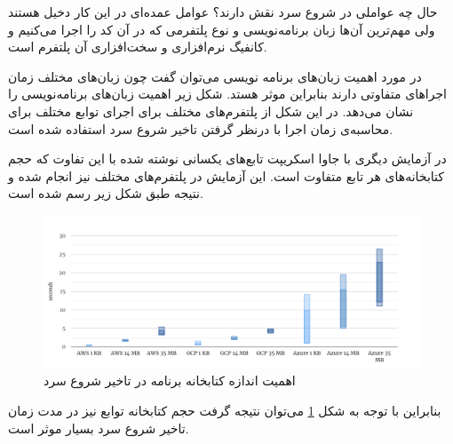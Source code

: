 حال چه عواملی در شروع سرد نقش دارند؟ عوامل عمده‌ای در این کار دخیل هستند ولی مهم‌ترین آن‌ها زبان برنامه‌نویسی و نوع پلتفرمی که در آن کد را اجرا می‌کنیم و کانفیگ نرم‌افزاری و سخت‌افزاری آن پلتفرم است. 

در مورد اهمیت زبان‌های برنامه نویسی می‌توان گفت چون زبان‌های مختلف زمان اجراهای متفاوتی دارند بنابراین موثر هستد. شکل زیر اهمیت زبان‌های برنامه‌نویسی را نشان می‌دهد. در این شکل از پلتفرم‌های مختلف برای اجرای توابع مختلف برای محاسبه‌ی زمان اجرا با درنظر گرفتن تاخیر شروع سرد استفاده شده است. 

در آزمایش دیگری با جاوا اسکریپت تابع‌های یکسانی نوشته شده با این تفاوت که حجم کتابخانه‌های هر تابع متفاوت است. این آزمایش در پلتفرم‌های مختلف نیز انجام شده و نتیجه طبق شکل زیر رسم شده است. 

\begin{figure}
	\centering
	\includegraphics[width=\linewidth]{figs/ColdStart-programming-language-libraries}
	\caption {اهمیت اندازه کتابخانه برنامه  در تاخیر شروع سرد}
	\label{fig:ColdStart-programming-language-libraries}
\end{figure}

بنابراین با توجه به شکل \ref{fig:ColdStart-programming-language-libraries} می‌توان نتیجه گرفت حجم کتابخانه توابع نیز در مدت زمان تاخیر شروع سرد بسیار موثر است. 